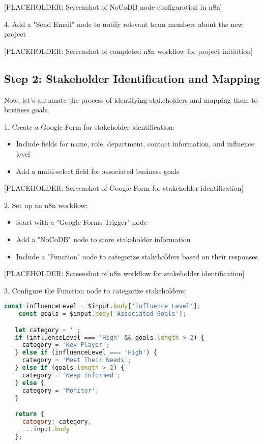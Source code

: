 [PLACEHOLDER: Screenshot of NoCoDB node configuration in n8n]

4. Add a "Send Email" node to notify relevant team members about the new project

[PLACEHOLDER: Screenshot of completed n8n workflow for project initiation]

\subsection{Step 2: Stakeholder Identification and Mapping}

Now, let's automate the process of identifying stakeholders and mapping them to business goals.

1. Create a Google Form for stakeholder identification:
\begin{itemize}
    \item Include fields for name, role, department, contact information, and influence level
    \item Add a multi-select field for associated business goals
\end{itemize}

[PLACEHOLDER: Screenshot of Google Form for stakeholder identification]

2. Set up an n8n workflow:
\begin{itemize}
    \item Start with a "Google Forms Trigger" node
    \item Add a "NoCoDB" node to store stakeholder information
    \item Include a "Function" node to categorize stakeholders based on their responses
\end{itemize}

[PLACEHOLDER: Screenshot of n8n workflow for stakeholder identification]

3. Configure the Function node to categorize stakeholders:
\begin{lstlisting}[language=JavaScript]
    const influenceLevel = $input.body['Influence Level'];
    const goals = $input.body['Associated Goals'];

   let category = '';
   if (influenceLevel === 'High' && goals.length > 2) {
     category = 'Key Player';
   } else if (influenceLevel === 'High') {
     category = 'Meet Their Needs';
   } else if (goals.length > 2) {
     category = 'Keep Informed';
   } else {
     category = 'Monitor';
   }

   return {
     category: category,
     ...input.body
   };
\end{lstlisting}

